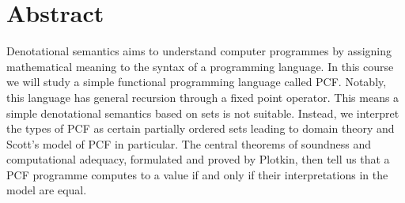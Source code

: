 \chapter{Abstract}

Denotational semantics aims to understand computer programmes by assigning
mathematical meaning to the syntax of a programming language.
%
In this course we will study a simple functional programming language called
PCF. Notably, this language has general recursion through a fixed point
operator.
%
This means a simple denotational semantics based on sets is not
suitable. Instead, we interpret the types of PCF as certain partially ordered
sets leading to domain theory and Scott's model of PCF in particular.
%
The central theorems of soundness and computational adequacy, formulated and
proved by Plotkin, then tell us that a PCF programme computes to a value if and
only if their interpretations in the model are equal.


